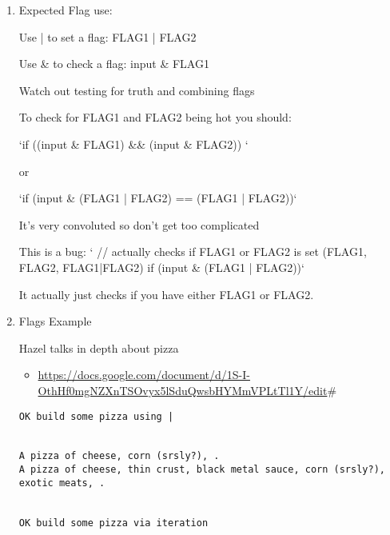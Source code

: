 \documentclass[11pt]{article}
\begin{document}
\begin{enumerate}
\item Expected Flag use:
\label{sec:org1e96ee6}

Use | to set a flag:   FLAG1 | FLAG2

Use \& to check a flag: input \& FLAG1

Watch out testing for truth and combining flags

To check for FLAG1 and FLAG2 being hot you should:

`if ((input \& FLAG1) \&\& (input \& FLAG2)) `

or

`if (input \& (FLAG1 | FLAG2) == (FLAG1 | FLAG2))`

It's very convoluted so don't get too complicated

This is a bug:
`
// actually checks if FLAG1 or FLAG2 is set (FLAG1, FLAG2, FLAG1|FLAG2)
if (input \& (FLAG1 | FLAG2))`

It actually just checks if you have either FLAG1 or FLAG2.


\item Flags Example
\label{sec:org86032e7}

Hazel talks in depth about pizza
\begin{itemize}
\item \url{https://docs.google.com/document/d/1S-I-OthHf0mgNZXnTSOvyx5lSduQwsbHYMmVPLtTl1Y/edit}\#
\end{itemize}

\begin{verbatim}
OK build some pizza using |


A pizza of cheese, corn (srsly?), .
A pizza of cheese, thin crust, black metal sauce, corn (srsly?), exotic meats, .


OK build some pizza via iteration



\end{verbatim}
\end{enumerate}
\end{document}
